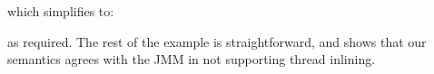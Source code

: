which simplifies to:
\begin{tikzdisplay}[node distance=1em]
\end{tikzdisplay}
as required. The rest of the example is straightforward, and shows that our semantics
agrees with the JMM in not supporting thread inlining.



